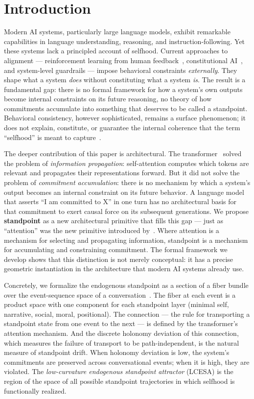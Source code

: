 \section{Introduction}
\label{sec:introduction}

Modern AI systems, particularly large language models, exhibit remarkable capabilities in language understanding, reasoning, and instruction-following. Yet these systems lack a principled account of selfhood. Current approaches to alignment --- reinforcement learning from human feedback~\cite{ouyang2022training}, constitutional AI~\cite{bai2022constitutional}, and system-level guardrails --- impose behavioral constraints \emph{externally}. They shape what a system \emph{does} without constituting what a system \emph{is}. The result is a fundamental gap: there is no formal framework for how a system's own outputs become internal constraints on its future reasoning, no theory of how commitments accumulate into something that deserves to be called a standpoint. Behavioral consistency, however sophisticated, remains a surface phenomenon; it does not explain, constitute, or guarantee the internal coherence that the term ``selfhood'' is meant to capture~\cite{LCESA}.

The deeper contribution of this paper is architectural. The transformer~\cite{vaswani2017attention} solved the problem of \emph{information propagation}: self-attention computes which tokens are relevant and propagates their representations forward. But it did not solve the problem of \emph{commitment accumulation}: there is no mechanism by which a system's output becomes an internal constraint on its future behavior. A language model that asserts ``I am committed to X'' in one turn has no architectural basis for that commitment to exert causal force on its subsequent generations. We propose \textbf{standpoint} as a new architectural primitive that fills this gap --- just as ``attention'' was the new primitive introduced by~\citet{vaswani2017attention}. Where attention is a mechanism for selecting and propagating information, standpoint is a mechanism for accumulating and constraining commitment. The formal framework we develop shows that this distinction is not merely conceptual: it has a precise geometric instantiation in the architecture that modern AI systems already use.

Concretely, we formalize the endogenous standpoint as a section of a fiber bundle over the event-sequence space of a conversation~\cite{LCESA, self-jurisdiction}. The fiber at each event is a product space with one component for each standpoint layer (minimal self, narrative, social, moral, positional). The connection --- the rule for transporting a standpoint state from one event to the next --- is defined by the transformer's attention mechanism. And the discrete holonomy deviation of this connection, which measures the failure of transport to be path-independent, is the natural measure of standpoint drift. When holonomy deviation is low, the system's commitments are preserved across conversational events; when it is high, they are violated. The \emph{low-curvature endogenous standpoint attractor} (LCESA) is the region of the space of all possible standpoint trajectories in which selfhood is functionally realized.

